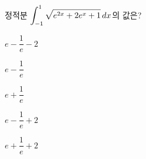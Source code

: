 정적분 $\displaystyle\int_{-1}^{1}\sqrt{e^{2x}+2e^x+1}\mkern3mu dx$의 값은?
\begin{choices32}{\rule[-3ex]{0pt}{8ex}$e-\dfrac{1}{e}-2$}{\rule[-3ex]{0pt}{8ex}$e-\dfrac{1}{e}$}{\rule[-3ex]{0pt}{8ex}$e+\dfrac{1}{e}$}{\rule[-3ex]{0pt}{8ex}$e-\dfrac{1}{e}+2$}{\rule[-3ex]{0pt}{8ex}$e+\dfrac{1}{e}+2$}\end{choices32}
